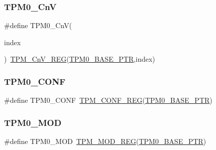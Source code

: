 \subsubsection{\texorpdfstring{T\+P\+M0\+\_\+\+CnV}{TPM0\_CnV}}
{\footnotesize\ttfamily \#define T\+P\+M0\+\_\+\+CnV(\begin{DoxyParamCaption}\item[{}]{index }\end{DoxyParamCaption})~\hyperlink{group___t_p_m___register___accessor___macros_gaf87163e32c337d1f46724110a85e8ea2}{T\+P\+M\+\_\+\+Cn\+V\+\_\+\+R\+EG}(\hyperlink{group___t_p_m___peripheral_ga8ba6c6fb69345639750108c3289a24c4}{T\+P\+M0\+\_\+\+B\+A\+S\+E\+\_\+\+P\+TR},index)}

\mbox{\label{group___t_p_m___register___accessor___macros_ga09ef091e6829f91a568ccc60793f802b}} 
\subsubsection{\texorpdfstring{T\+P\+M0\+\_\+\+C\+O\+NF}{TPM0\_CONF}}
{\footnotesize\ttfamily \#define T\+P\+M0\+\_\+\+C\+O\+NF~\hyperlink{group___t_p_m___register___accessor___macros_ga6c809a9824dbb88125be858cc3f362fd}{T\+P\+M\+\_\+\+C\+O\+N\+F\+\_\+\+R\+EG}(\hyperlink{group___t_p_m___peripheral_ga8ba6c6fb69345639750108c3289a24c4}{T\+P\+M0\+\_\+\+B\+A\+S\+E\+\_\+\+P\+TR})}

\mbox{\label{group___t_p_m___register___accessor___macros_ga05a02b85b7fe7838a90d03d66277ce1c}} 
\subsubsection{\texorpdfstring{T\+P\+M0\+\_\+\+M\+OD}{TPM0\_MOD}}
{\footnotesize\ttfamily \#define T\+P\+M0\+\_\+\+M\+OD~\hyperlink{group___t_p_m___register___accessor___macros_ga549fa5a6fe75d15bb21ae1a3925047c7}{T\+P\+M\+\_\+\+M\+O\+D\+\_\+\+R\+EG}(\hyperlink{group___t_p_m___peripheral_ga8ba6c6fb69345639750108c3289a24c4}{T\+P\+M0\+\_\+\+B\+A\+S\+E\+\_\+\+P\+TR})}

